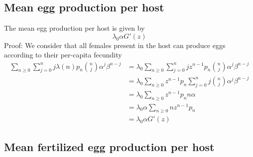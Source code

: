 \documentclass[bimj,fleqn]{w-art}
\theoremstyle{plain}
\theoremstyle{definition}
\begin{document}
\subsection{Mean egg production per host}
The mean egg production per host is given by
\begin{equation}\label{prodhuevos}
\lambda_0\alpha G'(z)
\end{equation}
Proof: We consider that all females present in the host can produce eggs according to their  per-capita fecundity
\begin{equation*}
\begin{split}
\sum_{n\geq 0}\sum_{j=0}^{n}j\lambda(n)p_n\binom{n}{j}\alpha^j\beta^{n-j}
&=\lambda_0\sum_{n\geq 0}\sum_{j=0}^{n}jz^{n-1}p_n\binom{n}{j}\alpha^j\beta^{n-j}\\
&=\lambda_0\sum_{n\geq 0}z^{n-1}p_n\sum_{j=0}^{n} j\binom{n}{j}\alpha^j\beta^{n-j}\\
&=\lambda_0\sum_{n\geq 0}z^{n-1}p_nn\alpha\\
&=\lambda_0\alpha  \sum_{n\geq 0}nz^{n-1}p_n \\
&=\lambda_0\alpha G'(z)
\end{split}
\end{equation*}

\subsection{Mean fertilized egg production per host}
\end{document}
